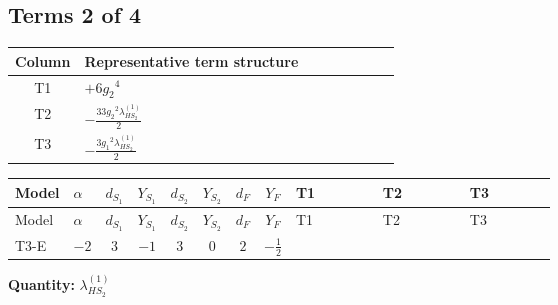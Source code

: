 \documentclass[8pt]{article}
\begin{document}
\begin{landscape}
\subsection*{Terms 2 of 4}
\begin{center}
\begin{tabular}{@{}c >{\raggedright\arraybackslash}p{0.82\linewidth}@{}}
\toprule
Column & Representative term structure \\
\midrule
T1 & \(\displaystyle +6 {g_2}^4\) \\
\midrule
T2 & \(\displaystyle -\frac{33 {g_2}^2 {\lambda_{HS_2}^{(1)}}}{2}\) \\
\midrule
T3 & \(\displaystyle -\frac{3 {g_1}^2 {\lambda_{HS_2}^{(1)}}}{2}\) \\
\midrule
\bottomrule
\end{tabular}
\end{center}
\smallskip
\tiny
\begin{longtable}{@{}llcccccc >{\raggedright\arraybackslash}p{0.21\linewidth} >{\raggedright\arraybackslash}p{0.21\linewidth} >{\raggedright\arraybackslash}p{0.21\linewidth}@{}}
\toprule
Model & $\alpha$ & $d_{S_1}$ & $Y_{S_1}$ & $d_{S_2}$ & $Y_{S_2}$ & $d_F$ & $Y_F$ & T1 & T2 & T3 \\
\midrule
\endfirsthead
\toprule
Model & $\alpha$ & $d_{S_1}$ & $Y_{S_1}$ & $d_{S_2}$ & $Y_{S_2}$ & $d_F$ & $Y_F$ & T1 & T2 & T3 \\
\midrule
\endhead
T3-E & $-2$ & $3$ & $-1$ & $3$ & $0$ & $2$ & $-\frac{1}{2}$ & \scriptsize\adjustbox{max width=\linewidth}{$\begin{gathered} +6 {g_2}^4\end{gathered}$} & \scriptsize\adjustbox{max width=\linewidth}{$\begin{gathered} -\frac{33 {g_2}^2 {\lambda_{HS_2}^{(1)}}}{2}\end{gathered}$} & \scriptsize\adjustbox{max width=\linewidth}{$\begin{gathered} -\frac{3 {g_1}^2 {\lambda_{HS_2}^{(1)}}}{2}\end{gathered}$} \\
\midrule
\bottomrule
\end{longtable}
\clearpage
\noindent\textbf{Quantity: }$\lambda_{HS_2}^{(1)}$\par\smallskip

\end{landscape}
\end{document}
